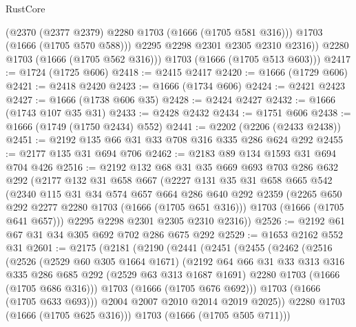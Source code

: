 \begin{lexlean}{RustCore}
\begin{coremodule}
              (@2370 (@2377 @2379) @2280 @1703 (@1666 (@1705 @581 @316)))
              @1703
              (@1666 (@1705 @570 @588)))
            @2295
            @2298
            @2301
            @2305
            @2310
            @2316))
        @2280
        @1703
        (@1666 (@1705 @562 @316)))
      @1703
      (@1666 (@1705 @513 @603)))
@2417 := @1724 (@1725 @606)
@2418 := @2415 @2417
@2420 := @1666 (@1729 @606)
@2421 := @2418 @2420
@2423 := @1666 (@1734 @606)
@2424 := @2421 @2423
@2427 := @1666 (@1738 @606 @35)
@2428 := @2424 @2427
@2432 := @1666 (@1743 @107 @35 @31)
@2433 := @2428 @2432
@2434 := @1751 @606
@2438 := @1666 (@1749 (@1750 @2434) @552)
@2441 := @2202 (@2206 (@2433 @2438))
@2451 := @2192 @135 @66 @31 @33 @708 @316 @335 @286 @624 @292
@2455 := @2177 @135 @31 @694 @706
@2462 := @2183 @89 @134 @1593 @31 @694 @704 @426
@2516 := @2192
    @132
    @68
    @31
    @35
    @669
    @693
    @703
    @286
    @632
    @292
    (@2177
      @132
      @31
      @658
      @667
      (@2227
        @131
        @35
        @31
        @658
        @665
        @542
        (@2340
          @115
          @31
          @34
          @574
          @657
          @664
          @286
          @640
          @292
          @2359
          (@2265 @650 @292 @2277 @2280 @1703 (@1666 (@1705 @651 @316)))
          @1703
          (@1666 (@1705 @641 @657)))
        @2295
        @2298
        @2301
        @2305
        @2310
        @2316))
@2526 := @2192 @61 @67 @31 @34 @305 @692 @702 @286 @675 @292
@2529 := @1653 @2162 @552 @31
@2601 := @2175
    (@2181
      (@2190
        (@2441
          (@2451
            (@2455
              (@2462
                (@2516
                  (@2526
                    (@2529 @60 @305 @1664 @1671)
                    (@2192
                      @64
                      @66
                      @31
                      @33
                      @313
                      @316
                      @335
                      @286
                      @685
                      @292
                      (@2529 @63 @313 @1687 @1691)
                      @2280
                      @1703
                      (@1666 (@1705 @686 @316)))
                    @1703
                    (@1666 (@1705 @676 @692)))
                  @1703
                  (@1666 (@1705 @633 @693)))
                @2004
                @2007
                @2010
                @2014
                @2019
                @2025))
            @2280
            @1703
            (@1666 (@1705 @625 @316)))
          @1703
          (@1666 (@1705 @505 @711)))

\end{coremodule}
\end{lexlean}
